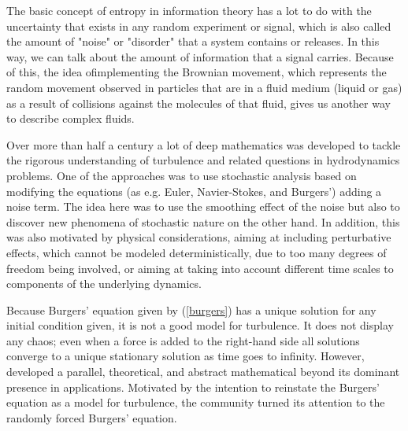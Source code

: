     The basic concept of entropy in information theory has a lot to do with the uncertainty that exists in any random experiment or signal, which is also called the amount of "noise" or "disorder" that a system contains or releases. In this way, we can talk about the amount of information that a signal carries. Because of this, the idea of ​​implementing the Brownian movement, which represents the random movement observed in particles that are in a fluid medium (liquid or gas) as a result of collisions against the molecules of that fluid, gives us another way to describe complex fluids. 
        
    Over more than half a century a lot of deep mathematics was developed to tackle the rigorous understanding of turbulence and related questions in hydrodynamics problems. One of the approaches was to use stochastic analysis based on modifying the equations (as e.g. Euler, Navier-Stokes, and Burgers') adding a noise term. The idea here was to use the smoothing effect of the noise but also to discover new phenomena of stochastic nature on the other hand. In addition, this was also motivated by physical considerations, aiming at including perturbative effects, which cannot be modeled deterministically, due to too many degrees of freedom being involved, or aiming at taking into account different time scales to components of the underlying dynamics.
    
    Because Burgers' equation given by (\ref{burgers}) has a unique solution for any initial condition given, it is not a good model for turbulence. It does not display any chaos; even when a force is added to the right-hand side all solutions converge to a unique stationary solution as time goes to infinity. However, developed a parallel, theoretical, and abstract mathematical beyond its dominant presence in applications. Motivated by the intention to reinstate the Burgers' equation as a model for turbulence, the community turned its attention to the randomly forced Burgers' equation.
    
